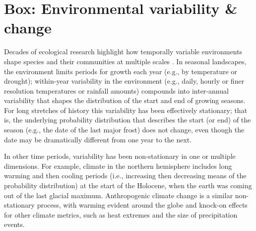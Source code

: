 \documentclass[11pt,letterpaper]{article}
\begin{document}


\newpage


\section{Box: Environmental variability \& change} %
Decades of ecological research highlight how temporally variable environments shape species and their communities at multiple scales \citep{Sale:1977oq,Chesson:1997dz}.  In seasonal landscapes, the environment limits periods for growth each year (e.g., by temperature or drought); within-year variability in the environment (e.g., daily, hourly or finer resolution temperatures or rainfall amounts) compounds into inter-annual variability that shapes the distribution of the start and end of growing seasons. For long stretches of history this variability has been effectively stationary; that is, the underlying probability distribution that describes the start (or end) of the season (e.g., the date of the last major frost) does not change, even though the date may be dramatically different from one year to the  next. %

In other time periods, variability has been non-stationary in one or multiple dimensions. For example, climate in the northern hemisphere includes long warming and then cooling periods (i.e., increasing then decreasing means of the probability distribution) at the start of the Holocene, when the earth was coming out of the last glacial maximum. Anthropogenic climate change is a similar non-stationary process, with warming evident around the globe and knock-on effects for other climate metrics, such as heat extremes and the size of precipitation events. %
\end{document}
